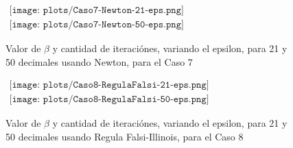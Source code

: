 \begin{figure} [H]
$\begin{array}{c}
\texttt{[image: plots/Caso7-Newton-21-eps.png]} \\
\texttt{[image: plots/Caso7-Newton-50-eps.png]}
\end{array}$
\label{fig:Newton-Eps-Caso4}
\caption{Valor de $\beta$ y cantidad de iteraci\'ones, variando el epsilon, para 21 y 50 
decimales usando Newton, para el Caso 7}
\end{figure}


\begin{figure} [H]
$\begin{array}{c}
\texttt{[image: plots/Caso8-RegulaFalsi-21-eps.png]} \\
\texttt{[image: plots/Caso8-RegulaFalsi-50-eps.png]}
\end{array}$
\label{fig:RegulaFalsi-Eps-Caso4}
\caption{Valor de $\beta$ y cantidad de iteraci\'ones, variando el epsilon, para 21 y 50 
decimales usando Regula Falsi-Illinois, para el Caso 8}
\end{figure}

